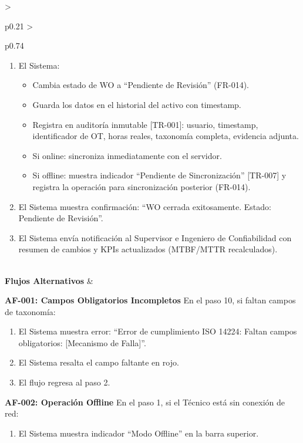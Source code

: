 \begin{longtable}{>{\raggedright\arraybackslash}p{0.21\textwidth} >{\raggedright\arraybackslash}p{0.74\textwidth}}
{\begin{enumerate}[leftmargin=1.5em, nosep, topsep=0pt]
\begin{itemize}[leftmargin=1.2em, nosep, topsep=0pt]
\item Si todos completos: continúa.
\end{itemize}
\item El Sistema:
\begin{itemize}[leftmargin=1.2em, nosep, topsep=0pt]
\item Cambia estado de WO a ``Pendiente de Revisión'' (FR-014).
\item Guarda los datos en el historial del activo con timestamp.
\item Registra en auditoría inmutable [TR-001]: usuario, timestamp, identificador de OT, horas reales, taxonomía completa, evidencia adjunta.
\item Si online: sincroniza inmediatamente con el servidor.
\item Si offline: muestra indicador ``Pendiente de Sincronización'' [TR-007] y registra la operación para sincronización posterior (FR-014).
\end{itemize}
\item El Sistema muestra confirmación: ``WO cerrada exitosamente. Estado: Pendiente de Revisión''.
\item El Sistema envía notificación al Supervisor e Ingeniero de Confiabilidad con resumen de cambios y KPIs actualizados (MTBF/MTTR recalculados).
\end{enumerate} \vspace{2pt}} \\
\textbf{Flujos Alternativos} & \parbox[t]{\linewidth}{\vspace{2pt} \vspace{4pt}\noindent\textbf{AF-001: Campos Obligatorios Incompletos}
\newline
En el paso 10, si faltan campos de taxonomía:
\begin{enumerate}[leftmargin=1.5em, nosep, topsep=0pt]
\item El Sistema muestra error: ``Error de cumplimiento ISO 14224: Faltan campos obligatorios: [Mecanismo de Falla]''.
\item El Sistema resalta el campo faltante en rojo.
\item El flujo regresa al paso 2.
\end{enumerate}
\vspace{4pt}\noindent\textbf{AF-002: Operación Offline}
\newline
En el paso 1, si el Técnico está sin conexión de red:
\begin{enumerate}[leftmargin=1.5em, nosep, topsep=0pt]
\item El Sistema muestra indicador ``Modo Offline'' en la barra superior.

\end{enumerate}}
\end{longtable}
